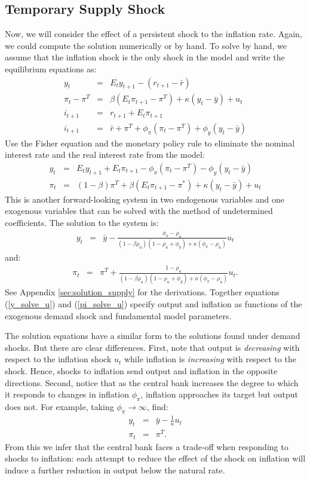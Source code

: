 \documentclass[12pt,fleqn]{article}
\newcommand{\EE}{\begin{eqnarray}}
\newcommand{\FF}{\end{eqnarray}}
\begin{document}
\subsection{Temporary Supply Shock}

Now, we will consider the effect of a persistent shock to the inflation rate. Again, we could compute the solution numerically or  by hand. To solve by hand, we assume that the inflation shock is the only shock in the model and write the equilibrium equations as:
	\EE
	y_t & = & E_t y_{t+1}  - \left( r_{t+1} - \bar{r}\right)\\
	\pi_t -\pi^T & = & \beta \left( E_t\pi_{t+1} - \pi^T\right)  + \kappa (y_t -\bar{y}) + u_t\\
	i_{t+1} & = & r_{t+1} + E_t \pi_{t+1}\\
	i_{t+1} & = & \bar{r} + \pi^T + \phi_{\pi}\left(\pi_t - \pi^T\right) + \phi_y \left(y_t - \bar{y}\right)
	\FF
Use the Fisher equation and the monetary policy rule to eliminate the nominal interest rate and the real interest rate from the model:
	\EE
	y_t & = & E_t y_{t+1} + E_t\pi_{t+1}  - \phi_{\pi}\left(\pi_t - \pi^T\right) - \phi_y \left(y_t - \bar{y}\right)\\
	\pi_t & = & (1-\beta) \pi^T + \beta \left( E_t\pi_{t+1} - \pi^*\right)  + \kappa (y_t -\bar{y}) + u_t
	\FF
This is another forward-looking system in two endogenous variables and one exogenous variables that can be solved with the method of undetermined coefficients. The solution to the system is:
	\EE
	y_t & = &\bar{y} -  \frac{\phi_{\pi}- \rho_u}{(1-\beta \rho_u)(1-\rho_u+\phi_y) + \kappa (\phi_{\pi} - \rho_u)}u_t \label{y_solve_u}
	\FF
and:
	\EE
	\pi_t & = & \pi^T + \frac{1-\rho_u}{(1-\beta \rho_u)(1-\rho_u+\phi_y) + \kappa (\phi_{\pi} - \rho_u)}u_t.\label{pi_solve_u}
	\FF
See Appendix \ref{sec:solution_supply} for the derivations. Together equations (\ref{y_solve_u}) and (\ref{pi_solve_u}) specify output and inflation as functions of the exogenous demand shock and fundamental model parameters.

The solution equations have a similar form to the solutions found under demand shocks. But there are clear differences. First, note that output is \emph{decreasing} with respect to the inflation shock $u_t$ while inflation is \emph{increasing} with respect to the shock. Hence, shocks to inflation send output and inflation in the opposite directions. Second, notice that as the central bank increases the degree to which it responds to changes in inflation $\phi_{\pi}$, inflation approaches its target but output does not. For example, taking $\phi_{\pi}\rightarrow\infty$, find:
	\EE
	y_t   & = &\bar{y} - \frac{1}{\kappa} u_t\\
	\pi_t & = & \pi^T.
	\FF
From this we infer that the central bank faces a trade-off when responding to shocks to inflation: each attempt to reduce the effect of the shock on inflation will induce a further reduction in output below the natural rate.
\end{document}
